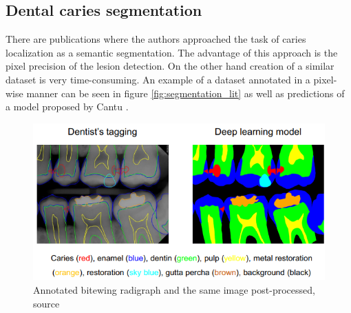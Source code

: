 \subsection{Dental caries segmentation}
There are publications where the authors approached the task of caries localization as a semantic segmentation. The advantage of this approach is the pixel precision of the lesion detection. On the other hand creation of a similar dataset is very time-consuming. An example of a dataset annotated in a pixel-wise manner can be seen in figure \ref{fig:segmentation_lit} as well as predictions of a model proposed by Cantu \cite{Cantu2020}.

\begin{figure}
    \centering
    \includegraphics[width=\linewidth]{images/segmentation_bitewing_rich.png}
    \caption{Annotated bitewing radigraph and the same image post-processed, source \cite{Lee2021}}
    \label{fig:bitewing_dense}
\end{figure}

